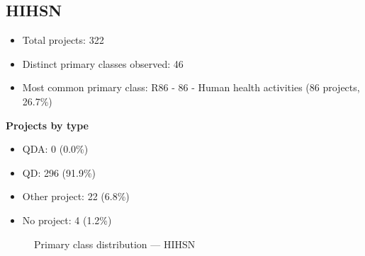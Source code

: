 \subsection{HIHSN}

\begin{itemize}
    \item Total projects: 322
    \item Distinct primary classes observed: 46
    \item Most common primary class: R86 - 86 - Human health activities (86 projects, 26.7\%)
\end{itemize}
\textbf{Projects by type}
\begin{itemize}
    \item QDA: 0 (0.0\%)
    \item QD: 296 (91.9\%)
    \item Other project: 22 (6.8\%)
    \item No project: 4 (1.2\%)
\end{itemize}

\begin{figure}[h]
    \centering
    
    \caption{Primary class distribution --- HIHSN}
\end{figure}

